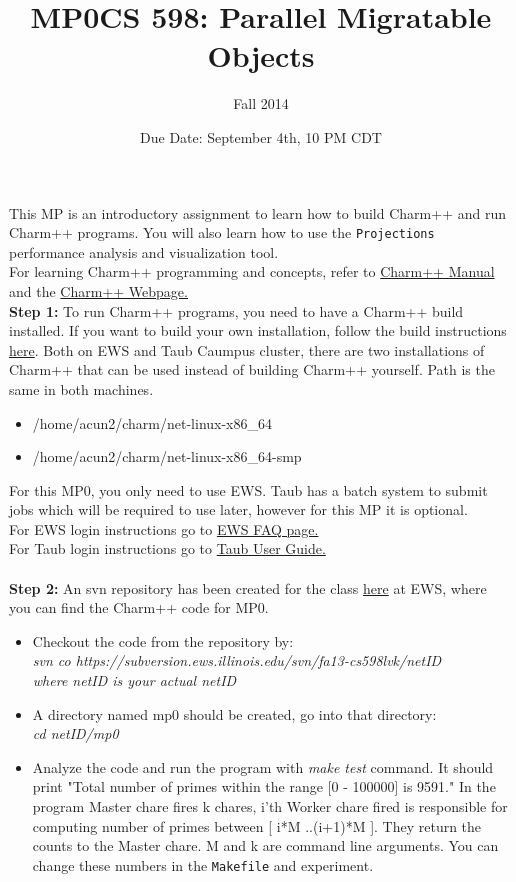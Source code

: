 \documentclass{article}
\title{MP0}
\title{CS 598: Parallel Migratable Objects}
\author{Fall 2014}
\date{Due Date: September 4th, 10 PM CDT}
\begin{document}
\maketitle

This MP is an introductory assignment to learn how to build Charm++ and run
Charm++ programs. You will also learn how to use the \texttt{Projections}
performance analysis and visualization tool. \\

For learning Charm++ programming and concepts, refer to
\href{http://charm.cs.illinois.edu/manuals/html/charm++/}{Charm++ Manual} and
the \href{http://charmplusplus.org/}{Charm++ Webpage.}\\

\textbf{Step 1:} To run Charm++ programs, you need to have a Charm++ build
installed. If you want to build your own installation, follow the build
instructions \href{http://charm.cs.illinois.edu/manuals/html/charm++/A.html}{here}. Both
on EWS and Taub Caumpus cluster, there are two installations of Charm++ that can
be used instead of building Charm++ yourself. Path is the same in both machines. 
\begin{itemize}
\item /home/acun2/charm/net-linux-x86\_64
\item /home/acun2/charm/net-linux-x86\_64-smp\\
\end{itemize}
For this MP0, you only need to use EWS. Taub has a batch
system to submit jobs which will be required to use later, however for this MP
it is optional.\\
For EWS login instructions go to
\href{http://it.engineering.illinois.edu/ews/lab-information/ews-faq}{EWS FAQ
page.} \\
For Taub login instructions go to
\href{https://campuscluster.illinois.edu/user\_info/doc/}{Taub User Guide.} \\
\\
\textbf{Step 2:} An svn repository has been created for the class
\href{https://subversion.ews.illinois.edu/svn/fa13-cs598lvk/}{here} at EWS, where you can find the Charm++ code for MP0. \\
\begin{itemize}
\item Checkout the code from the repository by: \\
        \textit{svn co
        https://subversion.ews.illinois.edu/svn/fa13-cs598lvk/netID \\
        where netID is your actual netID}
\item A directory named mp0 should be created, go into that directory: \\
        \textit{cd netID/mp0}
\item Analyze the code and run the program with \textit{make test} command.
It should print "Total number of primes within the range [0 - 100000] is 9591." In the program Master chare fires k chares, i'th Worker chare fired is responsible for
computing number of primes between [ i*M ..(i+1)*M ]. They return the counts to
the Master chare. M and k are command line arguments. You can change these numbers in the \texttt{Makefile} and experiment.

\end{itemize}
\end{document}
